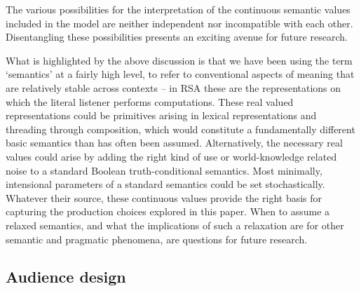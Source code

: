 \documentclass[11pt]{article}
\begin{document}
The various possibilities for the interpretation of the continuous semantic values included in the model are neither independent nor incompatible with each other. Disentangling these possibilities presents an exciting avenue for future research.

What is highlighted by the above discussion is that we have been using the term `semantics' at a fairly high level, to refer to conventional aspects of meaning that are relatively stable across contexts -- in RSA these are the representations on which the literal listener performs computations. These real valued representations could be primitives arising in lexical representations and threading through composition, which would constitute a fundamentally different basic semantics than has often been assumed. Alternatively, the necessary real values could arise by adding the right kind of use or world-knowledge related noise to a standard Boolean truth-conditional semantics. Most minimally, intensional parameters of a standard semantics could be set stochastically.
Whatever their source, these continuous values provide the right basis for capturing the production choices explored in this paper. When to assume a relaxed semantics, and what the implications of such a relaxation are for other semantic and pragmatic phenomena, are questions for future research.



\subsection{Audience design}
\end{document}
